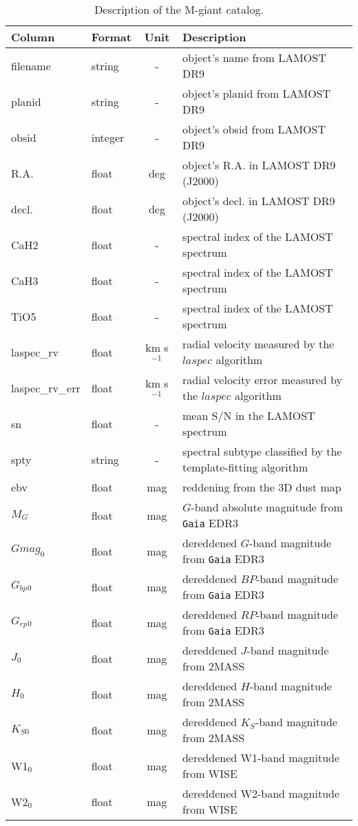 \documentclass[manuscript]{aastex62}
\newcommand{\gaia}{\texttt{Gaia}}
\begin{document}
\begin{CJK*}{UTF8}{gbsn}
\begin{table*}
\caption{Description of the M-giant catalog.}
\tabletypesize{\footnotesize}
\label{ctlg}
 \centering
\begin{tabular}{llcl}
\hline
Column &  Format  & Unit   & Description \\
\hline
filename & string & - & object's name from LAMOST DR9 \\
planid & string & - & object's planid from LAMOST DR9 \\
obsid & integer & - & object's obsid from LAMOST DR9 \\
R.A. & float & deg & object's R.A. in LAMOST DR9 (J2000)\\
decl. & float & deg & object's decl. in LAMOST DR9 (J2000)\\
CaH2 & float & -  & spectral index of the LAMOST spectrum \\
CaH3 & float & -  & spectral index of the LAMOST spectrum \\
TiO5 & float & -  & spectral index of the LAMOST spectrum \\
laspec\_rv & float & km s$^{-1}$ & radial velocity measured by the $laspec$ algorithm \\
laspec\_rv\_err & float & km s$^{-1}$ & radial velocity error measured by the $laspec$ algorithm \\
sn & float & - & mean S/N in the LAMOST spectrum \\
spty & string & -  & spectral subtype classified by the template-fitting algorithm \\
ebv & float & mag &  reddening from the 3D dust map\\
$M_G$ &  float & mag & $G$-band absolute magnitude from \gaia{} EDR3\\
$Gmag_0$ &  float & mag & dereddened $G$-band magnitude from \gaia{} EDR3\\
$G_{bp}$$_0$ &  float & mag & dereddened  $BP$-band magnitude from \gaia{} EDR3\\
$G_{rp}$$_0$ &  float & mag & dereddened  $RP$-band magnitude from \gaia{} EDR3\\
$J_0$ &  float & mag & dereddened $J$-band magnitude from 2MASS\\
$H_0$ &  float & mag & dereddened $H$-band magnitude from 2MASS\\
$K_{S0}$ &  float & mag & dereddened $K_S$-band magnitude from 2MASS\\
W1$_0$ &  float & mag & dereddened W1-band magnitude from WISE\\
W2$_0$ &  float & mag & dereddened W2-band magnitude from WISE\\

\end{tabular}
\end{table*}
\end{CJK*}
\end{document}
